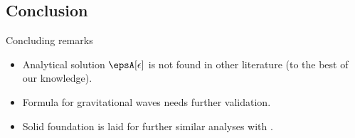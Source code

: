 \subsection{Conclusion}



\begin{frame}{Concluding remarks}
    \begin{itemize}
        \item Analytical solution $\epsA[\epsilon]$ is not found in other literature (to the best of our knowledge). 
        \item Formula for gravitational waves needs further validation. 
        \item Solid foundation is laid for further similar analyses with \asgrd. 
    \end{itemize}

\begin{notes}[1][conclusion]
\end{notes}
\end{frame}



    



